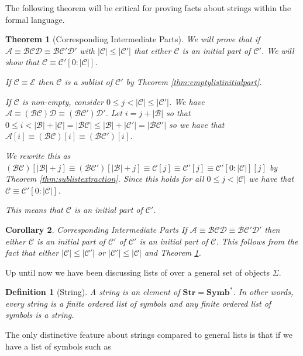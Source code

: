 \documentclass[12pt]{article}
\theoremstyle{break}
\newtheorem{definition}{Definition}[section]
\theoremstyle{break}
\newtheorem{theorem}{Theorem}[section]
\theoremstyle{break}
\newtheorem{corollary}[theorem]{Corollary}
\theoremstyle{break}
\newcommand{\mc}[1]{\mathcal{#1}}
\begin{document}
The following theorem will be critical for proving facts about strings within the formal language.

\begin{theorem}[Corresponding Intermediate Parts]
\label{thm:corrintpart}
We will prove that if $\mc{A}\equiv \mc{B}\mc{C}\mc{D} \equiv \mc{B}\mc{C}'\mc{D}'$ with $|\mc{C}| \le |\mc{C}'|$ that either $\mc{C}$ is an initial part of $\mc{C}'$.
We will show that $\mc{C} \equiv \mc{C}'[0:|\mc{C}|]$.

If $\mc{C}\equiv\mc{E}$ then $\mc{C}$ is a sublist of $\mc{C}'$ by Theorem \ref{thm:emptylistinitialpart}.

If $\mc{C}$ is non-empty, consider $0 \le j < |\mc{C}| \le |\mc{C}'|$.
We have $\mc{A} \equiv (\mc{B}\mc{C})\mc{D} \equiv (\mc{B}\mc{C}')\mc{D}'$.
Let $i = j + |\mc{B}|$ so that $0 \le i < |\mc{B}|+|\mc{C}| =|\mc{B}\mc{C}| \le |\mc{B}|+|\mc{C}'| = |\mc{B}\mc{C}'|$ so we have that $\mc{A}[i] \equiv (\mc{B}\mc{C})[i] \equiv (\mc{B}\mc{C}')[i]$. 

We rewrite this as $(\mc{B}\mc{C})[|\mc{B}|+j] \equiv (\mc{B}\mc{C}')[|\mc{B}|+j] \equiv \mc{C}[j] \equiv \mc{C}'[j] \equiv \mc{C}'[0:|\mc{C}|][j]$ by Theorem \ref{thm:sublistextraction}.
Since this holds for all $0 \le j < |\mc{C}|$ we have that $\mc{C} \equiv \mc{C}'[0:|\mc{C}|]$.

This means that $\mc{C}$ is an initial part of $\mc{C}'$.
\end{theorem}

\begin{corollary}{Corresponding Intermediate Parts}
\label{corr:intpart}
If $\mc{A} \equiv \mc{B}\mc{C}\mc{D} \equiv \mc{B}\mc{C}'\mc{D}'$ then either $\mc{C}$ is an initial part of $\mc{C}'$ of $\mc{C}'$ is an initial part of $\mc{C}$.
This follows from the fact that either $|\mc{C}| \le |\mc{C}'|$ or $|\mc{C}'| \le |\mc{C}|$ and Theorem \ref{thm:corrintpart}.
\end{corollary}

Up until now we have been discussing lists of over a general set of objects $\Sigma$.

\begin{definition}[String]
A string is an element of $\textbf{Str} = \textbf{Symb}^*$.
In other words, every string is a finite ordered list of symbols and any finite ordered list of symbols is a string.
\end{definition}

The only distinctive feature about strings compared to general lists is that if we have a list of symbols such as 
\end{document}
